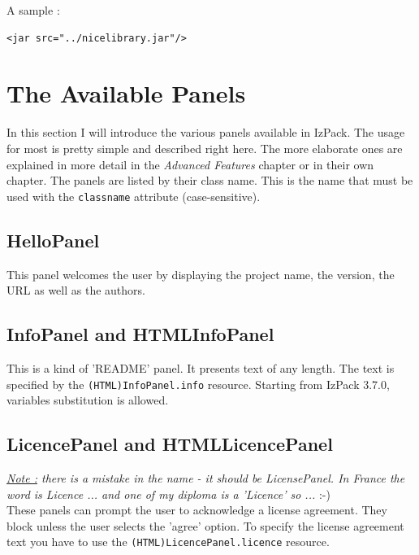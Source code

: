 A sample :
\footnotesize
\begin{verbatim}
<jar src="../nicelibrary.jar"/>
\end{verbatim}
\normalsize

\section{The Available Panels}

In this section I will introduce the various panels available in IzPack.
The usage for most is pretty simple and described right here. The more
elaborate ones are explained in more detail in the \textit{Advanced
Features} chapter or in their own chapter. The panels are listed by
their class name. This is the name that must be used with the
\texttt{classname} attribute (case-sensitive).\\

\subsection{HelloPanel}

This panel welcomes the user by displaying the project name, the
version, the URL as well as the authors.\\

\subsection{InfoPanel and HTMLInfoPanel}

This is a kind of 'README' panel. It presents text of any length. The
text is specified by the \texttt{(HTML)InfoPanel.info} resource. Starting from
IzPack 3.7.0, variables substitution is allowed.\\

\subsection{LicencePanel and HTMLLicencePanel}

\noindent
\textit{\underline{Note :} there is a mistake in the name - it should be
LicensePanel. In France the word is Licence ... and one of my diploma is a
'Licence' so ...} :-)\\

These panels can prompt the user to acknowledge a license agreement. They block
unless the user selects the 'agree' option. To specify the license agreement
text you have to use the \texttt{(HTML)LicencePanel.licence} resource.\\


